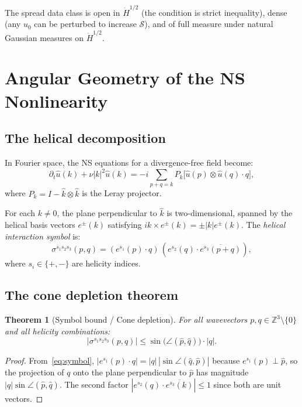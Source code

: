 \documentclass[11pt]{article}
\newtheorem{theorem}{Theorem}[section]
\theoremstyle{definition}
\newcommand{\Z}{\mathbb{Z}}
\newcommand{\Hdot}[1]{\dot{H}^{#1}}
\newcommand{\cS}{\mathcal{S}}
\begin{document}
The spread data class is open in $\Hdot{1/2}$ (the
condition is strict inequality), dense (any $u_0$ can
be perturbed to increase $\cS$), and of full measure
under natural Gaussian measures on $\Hdot{1/2}$.


\section{Angular Geometry of the NS Nonlinearity}
\label{sec:geometry}

\subsection{The helical decomposition}

In Fourier space, the NS equations for a divergence-free
field become:
\begin{equation}\label{eq:NS-Fourier}
\partial_t\hat{u}(k) + \nu|k|^2\hat{u}(k)
= -i\sum_{p+q=k}P_k\bigl[\hat{u}(p)\otimes\hat{u}(q)
\cdot q\bigr],
\end{equation}
where $P_k = I - \hat{k}\otimes\hat{k}$ is the Leray
projector.

For each $k \neq 0$, the plane perpendicular to $\hat{k}$
is two-dimensional, spanned by the helical basis vectors
$e^\pm(k)$ satisfying $ik\times e^\pm(k) = \pm|k|e^\pm(k)$.
The \emph{helical interaction symbol} is:
\begin{equation}\label{eq:symbol}
\sigma^{s_1 s_2 s_3}(p,q) = (e^{s_1}(p)\cdot q)\,
(e^{s_2}(q)\cdot\overline{e^{s_3}(p+q)}),
\end{equation}
where $s_i \in \{+,-\}$ are helicity indices.


\subsection{The cone depletion theorem}

\begin{theorem}[Symbol bound / Cone depletion]
\label{thm:symbol-bound}
For all wavevectors $p,q \in \Z^3\setminus\{0\}$ and all
helicity combinations:
\begin{equation}\label{eq:symbol-bound}
|\sigma^{s_1 s_2 s_3}(p,q)|
\leq \sin\bigl(\angle(\hat{p},\hat{q})\bigr)\cdot|q|.
\end{equation}
\end{theorem}

\begin{proof}
From~\eqref{eq:symbol}, $|e^{s_1}(p)\cdot q|
= |q|\,|\sin\angle(\hat{q},\hat{p})|$ because $e^{s_1}(p)
\perp \hat{p}$, so the projection of $q$ onto the plane
perpendicular to $\hat{p}$ has magnitude
$|q|\sin\angle(\hat{p},\hat{q})$.
The second factor
$|e^{s_2}(q)\cdot\overline{e^{s_3}(k)}| \leq 1$
since both are unit vectors.
\end{proof}
\end{document}
